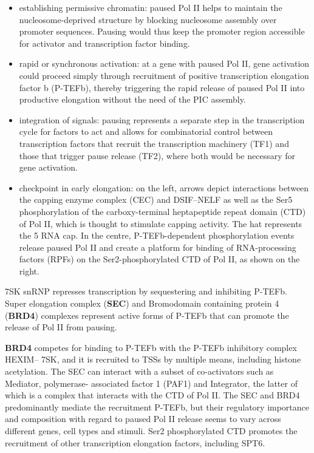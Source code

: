 \begin{itemize}
\tightlist
\item
  establishing permissive chromatin: paused Pol II helps to maintain the nucleosome-deprived structure by blocking nucleosome assembly over promoter sequences. Pausing would thus keep the promoter region accessible for activator and transcription factor binding.
\item
  rapid or synchronous activation: at a gene with paused Pol II, gene activation could proceed simply through recruitment of positive transcription elongation factor b (P-TEFb), thereby triggering the rapid release of paused Pol II into productive elongation without the need of the PIC assembly.
\item
  integration of signals: pausing represents a separate step in the transcription cycle for factors to act and allows for combinatorial control between transcription factors that recruit the transcription machinery (TF1) and those that trigger pause release (TF2), where both would be necessary for gene activation.
\item
  checkpoint in early elongation: on the left, arrows depict interactions between the capping enzyme complex (CEC) and DSIF--NELF as well as the Ser5 phosphorylation of the carboxy-terminal heptapeptide repeat domain (CTD) of Pol II, which is thought to stimulate capping activity. The hat represents the 5 RNA cap. In the centre, P-TEFb-dependent phosphorylation events release paused Pol II and create a platform for binding of RNA-processing factors (RPFs) on the Ser2-phosphorylated CTD of Pol II, as shown on the right.
\end{itemize}

7SK snRNP represses transcription by sequestering and inhibiting P-TEFb. Super elongation complex (\textbf{SEC}) and Bromodomain containing protein 4 (\textbf{BRD4}) complexes represent active forms of P-TEFb that can promote the release of Pol II from pausing.

\textbf{BRD4} competes for binding to P-TEFb with the P-TEFb inhibitory complex HEXIM-- 7SK, and it is recruited to TSSs by multiple means, including histone acetylation. The SEC can interact with a subset of co-activators such as Mediator, polymerase- associated factor 1 (PAF1) and Integrator, the latter of which is a complex that interacts with the CTD of Pol II. The SEC and BRD4 predominantly mediate the recruitment P-TEFb, but their regulatory importance and composition with regard to paused Pol II release seems to vary across different genes, cell types and stimuli. Ser2 phosphorylated CTD promotes the recruitment of other transcription elongation factors, including SPT6.


